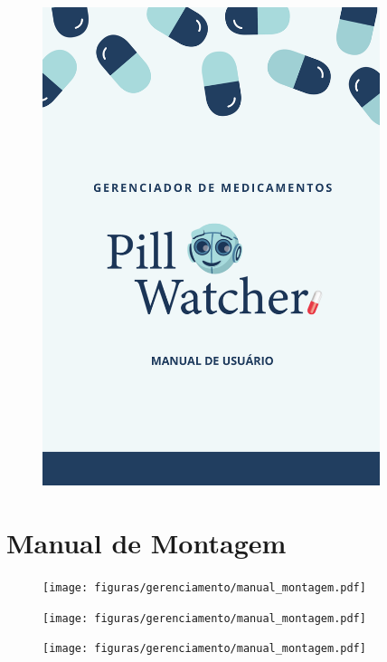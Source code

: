 \begin{apendicesenv}
\begin{figure}[H]
    \centering
    \includegraphics[width=0.88\textwidth,page=20]{figuras/gerenciamento/manual_usuario.pdf}
    \label{fig:manual_usuario_20}
\end{figure}

\chapter{Manual de Montagem}\label{manual_montagem}

\begin{figure}[H]
    \centering
    \texttt{[image: figuras/gerenciamento/manual\_montagem.pdf]}
    \label{fig:manual_montagem}
\end{figure}

\begin{figure}[H]
    \centering
    \texttt{[image: figuras/gerenciamento/manual\_montagem.pdf]}
    \label{fig:manual_montagem_2}
\end{figure}

\begin{figure}[H]
    \centering
    \texttt{[image: figuras/gerenciamento/manual\_montagem.pdf]}
    \label{fig:manual_montagem_3}
\end{figure}


\end{apendicesenv}
